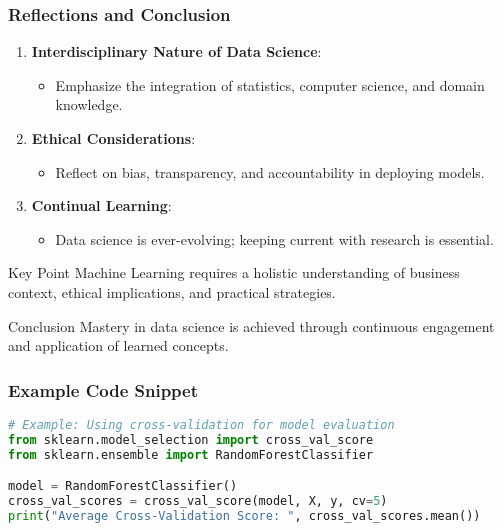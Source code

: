 \documentclass[aspectratio=169]{beamer}
\begin{document}
\begin{frame}[fragile]
    \frametitle{Reflections and Conclusion}
    \begin{enumerate}
        \item \textbf{Interdisciplinary Nature of Data Science}: 
            \begin{itemize}
                \item Emphasize the integration of statistics, computer science, and domain knowledge.
            \end{itemize}
        \item \textbf{Ethical Considerations}:
            \begin{itemize}
                \item Reflect on bias, transparency, and accountability in deploying models.
            \end{itemize}
        \item \textbf{Continual Learning}:
            \begin{itemize}
                \item Data science is ever-evolving; keeping current with research is essential.
            \end{itemize}
    \end{enumerate}

    \begin{block}{Key Point}
        Machine Learning requires a holistic understanding of business context, ethical implications, and practical strategies.
    \end{block}

    \begin{block}{Conclusion}
        Mastery in data science is achieved through continuous engagement and application of learned concepts.
    \end{block}
\end{frame}

\begin{frame}[fragile]
    \frametitle{Example Code Snippet}
    \begin{lstlisting}[language=Python]
# Example: Using cross-validation for model evaluation
from sklearn.model_selection import cross_val_score
from sklearn.ensemble import RandomForestClassifier

model = RandomForestClassifier()
cross_val_scores = cross_val_score(model, X, y, cv=5)
print("Average Cross-Validation Score: ", cross_val_scores.mean())
    \end{lstlisting}
\end{frame}
\end{document}

